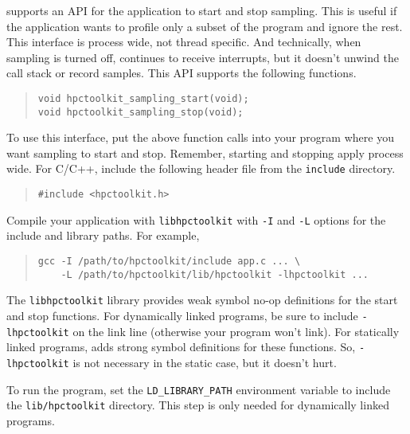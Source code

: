 \HPCToolkit{} supports an API for the application to start and stop
sampling.  This is useful if the application wants to profile only a
subset of the program and ignore the rest.  This interface is process
wide, not thread specific.  And technically, when sampling is turned
off, \hpcrun{} continues to receive interrupts, but it doesn't unwind
the call stack or record samples.  This API supports the following
functions.

\begin{quote}
\begin{verbatim}
void hpctoolkit_sampling_start(void);
void hpctoolkit_sampling_stop(void);
\end{verbatim}
\end{quote}

To use this interface, put the above function calls into your program
where you want sampling to start and stop.  Remember, starting and
stopping apply process wide.  For C/C++, include the following header
file from the \HPCToolkit{} {\tt include} directory.

\begin{quote}
\begin{verbatim}
#include <hpctoolkit.h>
\end{verbatim}
\end{quote}

Compile your application with {\tt libhpctoolkit} with {\tt -I} and
{\tt -L} options for the include and library paths.  For example,

\begin{quote}
\begin{verbatim}
gcc -I /path/to/hpctoolkit/include app.c ... \
    -L /path/to/hpctoolkit/lib/hpctoolkit -lhpctoolkit ...
\end{verbatim}
\end{quote}

The {\tt libhpctoolkit} library provides weak symbol no-op definitions
for the start and stop functions.  For dynamically linked programs, be
sure to include {\tt -lhpctoolkit} on the link line (otherwise your
program won't link).  For statically linked programs, \hpclink{} adds
strong symbol definitions for these functions.  So, {\tt -lhpctoolkit}
is not necessary in the static case, but it doesn't hurt.

To run the program, set the \verb|LD_LIBRARY_PATH| environment
variable to include the \HPCToolkit{} {\tt lib/hpctoolkit} directory.
This step is only needed for dynamically linked programs.

